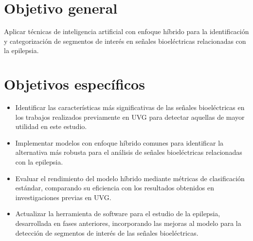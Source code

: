 \section{Objetivo general}
Aplicar técnicas de inteligencia artificial con enfoque híbrido para la identificación y categorización de segmentos de interés en señales bioeléctricas relacionadas con la epilepsia.

\section{Objetivos específicos}

\begin{itemize}

   \item Identificar las características más significativas de las señales bioeléctricas en los trabajos realizados previamente en UVG para detectar aquellas de mayor utilidad en este estudio.

    \item Implementar modelos con enfoque híbrido comunes para identificar la alternativa más robusta para el análisis de señales bioeléctricas relacionadas con la epilepsia.
    
    \item Evaluar el rendimiento del modelo híbrido mediante métricas de clasificación estándar, comparando su eficiencia con los resultados obtenidos en investigaciones previas en UVG.
    
    \item Actualizar la herramienta de software para el estudio de la epilepsia, desarrollada en fases anteriores, incorporando las mejoras al modelo para la detección de segmentos de interés de las señales bioeléctricas.

    
\end{itemize}







